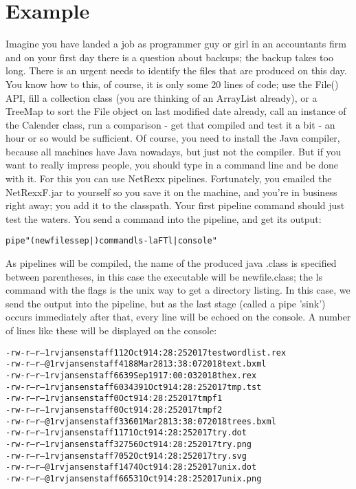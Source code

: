 \chapter{Example}
Imagine you have landed a job as programmer guy or girl in an accountants firm and on your first day there is a question about backups; the backup takes too long. There is an urgent needs to identify the files that are produced on this day. You know how to this, of course, it is only some 20 lines of code; use the File() API, fill a collection class (you are thinking of an ArrayList already), or a TreeMap to sort the File object on last modified date already, call an instance of the Calender class, run a comparison - get that compiled and test it a bit - an hour or so would be sufficient. Of course, you need to install the Java compiler, because all machines have Java nowadays, but just not the compiler.
But if you want to really impress people, you should type in a command line and be done with it. For this you can use NetRexx pipelines. Fortunately, you emailed the NetRexxF.jar to yourself so you save it on the machine, and you're in business right away; you add it to the classpath.
Your first pipeline command should just test the waters. You send a
command into the pipeline, and get its output:
\begin{alltt}
pipe "(newfiles sep |) command ls -laFTl | console"
\end{alltt}
As pipelines will be compiled, the name of the produced java .class is specified between parentheses, in this case the executable will be newfile.class; the ls command with the flags is the unix way to get a directory listing. In this case, we send the output into the pipeline, but as the last stage (called a pipe 'sink') occurs immediately after that, every line will be echoed on the console.
A number of lines like these will be displayed on the console:
\begin{alltt}
-rw-r--r-- 1 rvjansen staff 112 Oct 9 14:28:25 2017 testwordlist.rex
-rw-r--r--@ 1 rvjansen staff 4188 Mar 28 13:38:07 2018 text.bxml
-rw-r--r-- 1 rvjansen staff 6639 Sep 19 17:00:03 2018 thex.rex
-rw-r--r-- 1 rvjansen staff 6034391 Oct 9 14:28:25 2017 tmp.tst
-rw-r--r-- 1 rvjansen staff 0 Oct 9 14:28:25 2017 tmpf1
-rw-r--r-- 1 rvjansen staff 0 Oct 9 14:28:25 2017 tmpf2
-rw-r--r--@ 1 rvjansen staff 33601 Mar 28 13:38:07 2018 trees.bxml
-rw-r--r-- 1 rvjansen staff 1171 Oct 9 14:28:25 2017 try.dot
-rw-r--r-- 1 rvjansen staff 32756 Oct 9 14:28:25 2017 try.png
-rw-r--r-- 1 rvjansen staff 7052 Oct 9 14:28:25 2017 try.svg
-rw-r--r--@ 1 rvjansen staff 1474 Oct 9 14:28:25 2017 unix.dot
-rw-r--r--@ 1 rvjansen staff 66531 Oct 9 14:28:25 2017 unix.png
\end{alltt}
